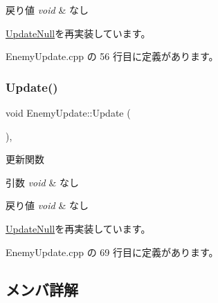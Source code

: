 \begin{DoxyRetVals}{戻り値}
{\em void} & なし \\
\hline
\end{DoxyRetVals}


\mbox{\hyperlink{class_update_null_a5bd107431c5039abe13c966edb047375}{Update\+Null}}を再実装しています。



 Enemy\+Update.\+cpp の 56 行目に定義があります。

\mbox{\label{class_enemy_update_ae9662f3a2d064dc69c0d68293e60f051}} 
\subsubsection{\texorpdfstring{Update()}{Update()}}
{\footnotesize\ttfamily void Enemy\+Update\+::\+Update (\begin{DoxyParamCaption}{ }\end{DoxyParamCaption})\hspace{0.3cm}{\ttfamily [override]}, {\ttfamily [virtual]}}



更新関数 


\begin{DoxyParams}{引数}
{\em void} & なし \\
\hline
\end{DoxyParams}

\begin{DoxyRetVals}{戻り値}
{\em void} & なし \\
\hline
\end{DoxyRetVals}


\mbox{\hyperlink{class_update_null_a692f4f34e4ef35ca286a1d3606fdf473}{Update\+Null}}を再実装しています。



 Enemy\+Update.\+cpp の 69 行目に定義があります。



\subsection{メンバ詳解}
\mbox{\label{class_enemy_update_a339b9c72d3144781291bc333dc0c971f}} 
